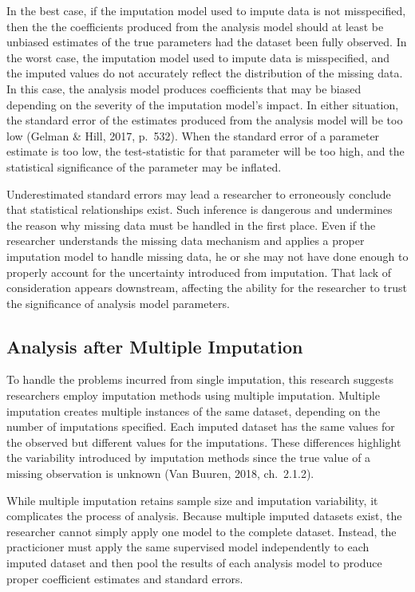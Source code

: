 \documentclass[12pt,oneside]{chicagocapstone}
\begin{document}
In the best case, if the imputation model used to impute data is not
misspecified, then the the coefficients produced from the analysis model
should at least be unbiased estimates of the true parameters had the
dataset been fully observed. In the worst case, the imputation model
used to impute data is misspecified, and the imputed values do not
accurately reflect the distribution of the missing data. In this case,
the analysis model produces coefficients that may be biased depending on
the severity of the imputation model's impact. In either situation, the
standard error of the estimates produced from the analysis model will be
too low (Gelman \& Hill, 2017, p.~532). When the standard error of a
parameter estimate is too low, the test-statistic for that parameter
will be too high, and the statistical significance of the parameter may
be inflated.

Underestimated standard errors may lead a researcher to erroneously
conclude that statistical relationships exist. Such inference is
dangerous and undermines the reason why missing data must be handled in
the first place. Even if the researcher understands the missing data
mechanism and applies a proper imputation model to handle missing data,
he or she may not have done enough to properly account for the
uncertainty introduced from imputation. That lack of consideration
appears downstream, affecting the ability for the researcher to trust
the significance of analysis model parameters.

\subsection*{Analysis after Multiple
Imputation}\label{background-analysis-multiple}

To handle the problems incurred from single imputation, this research
suggests researchers employ imputation methods using multiple
imputation. Multiple imputation creates multiple instances of the same
dataset, depending on the number of imputations specified. Each imputed
dataset has the same values for the observed but different values for
the imputations. These differences highlight the variability introduced
by imputation methods since the true value of a missing observation is
unknown (Van Buuren, 2018, ch.~2.1.2).

While multiple imputation retains sample size and imputation
variability, it complicates the process of analysis. Because multiple
imputed datasets exist, the researcher cannot simply apply one model to
the complete dataset. Instead, the practicioner must apply the same
supervised model independently to each imputed dataset and then pool the
results of each analysis model to produce proper coefficient estimates
and standard errors.
\end{document}
